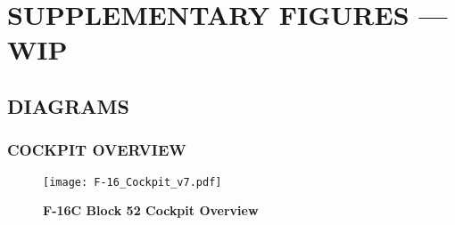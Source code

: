 \appendix
\chapter{SUPPLEMENTARY FIGURES --- WIP}
\localtableofcontents
\cleardoublepage


\section{DIAGRAMS}

\subsection{COCKPIT OVERVIEW}
\begin{figure}[h]
    \centering
    \texttt{[image: F-16\_Cockpit\_v7.pdf]}
    \caption{\textbf{F-16C Block 52 Cockpit Overview}}
    \label{fig:cockpitoverview}
\end{figure}

\cleardoublepage